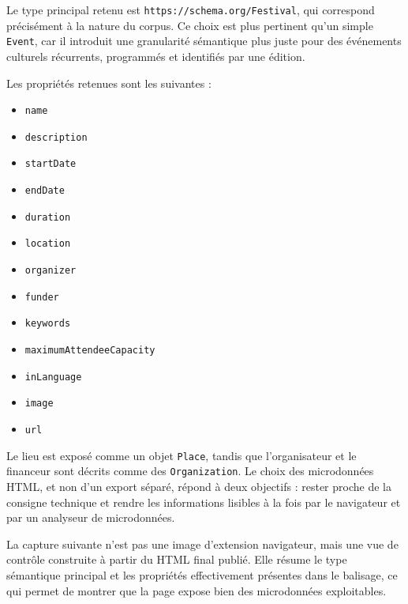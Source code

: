 \documentclass[11pt,a4paper]{article}
\begin{document}
Le type principal retenu est \texttt{https://schema.org/Festival}, qui correspond précisément à la nature du corpus. Ce choix est plus pertinent qu'un simple \texttt{Event}, car il introduit une granularité sémantique plus juste pour des événements culturels récurrents, programmés et identifiés par une édition.

Les propriétés retenues sont les suivantes :

\begin{itemize}
    \item \texttt{name}
    \item \texttt{description}
    \item \texttt{startDate}
    \item \texttt{endDate}
    \item \texttt{duration}
    \item \texttt{location}
    \item \texttt{organizer}
    \item \texttt{funder}
    \item \texttt{keywords}
    \item \texttt{maximumAttendeeCapacity}
    \item \texttt{inLanguage}
    \item \texttt{image}
    \item \texttt{url}
\end{itemize}

Le lieu est exposé comme un objet \texttt{Place}, tandis que l'organisateur et le financeur sont décrits comme des \texttt{Organization}. Le choix des microdonnées HTML, et non d'un export séparé, répond à deux objectifs : rester proche de la consigne technique et rendre les informations lisibles à la fois par le navigateur et par un analyseur de microdonnées.

La capture suivante n'est pas une image d'extension navigateur, mais une vue de contrôle construite à partir du HTML final publié. Elle résume le type sémantique principal et les propriétés effectivement présentes dans le balisage, ce qui permet de montrer que la page expose bien des microdonnées exploitables.
\end{document}
